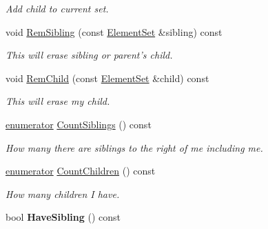 \begin{DoxyCompactItemize}
\begin{DoxyCompactList}\small\item\em Add child to current set. \end{DoxyCompactList}\item 
\hypertarget{classINMOST_1_1ElementSet_a8993015c5cb4f251d457c0bd02f31596}{void \hyperlink{classINMOST_1_1ElementSet_a8993015c5cb4f251d457c0bd02f31596}{Rem\-Sibling} (const \hyperlink{classINMOST_1_1ElementSet}{Element\-Set} \&sibling) const }\label{classINMOST_1_1ElementSet_a8993015c5cb4f251d457c0bd02f31596}

\begin{DoxyCompactList}\small\item\em This will erase sibling or parent's child. \end{DoxyCompactList}\item 
\hypertarget{classINMOST_1_1ElementSet_aa7b86070ba51b14b5cadcf598f6edb29}{void \hyperlink{classINMOST_1_1ElementSet_aa7b86070ba51b14b5cadcf598f6edb29}{Rem\-Child} (const \hyperlink{classINMOST_1_1ElementSet}{Element\-Set} \&child) const }\label{classINMOST_1_1ElementSet_aa7b86070ba51b14b5cadcf598f6edb29}

\begin{DoxyCompactList}\small\item\em This will erase my child. \end{DoxyCompactList}\item 
\hypertarget{classINMOST_1_1ElementSet_a0e93907cddd2f9486af14f497362f761}{\hyperlink{classINMOST_1_1Storage_ae333dfced6fa9cfde0c8e7dcf1b0cc2b}{enumerator} \hyperlink{classINMOST_1_1ElementSet_a0e93907cddd2f9486af14f497362f761}{Count\-Siblings} () const }\label{classINMOST_1_1ElementSet_a0e93907cddd2f9486af14f497362f761}

\begin{DoxyCompactList}\small\item\em How many there are siblings to the right of me including me. \end{DoxyCompactList}\item 
\hypertarget{classINMOST_1_1ElementSet_abd1a5a15dde363cd7c55d77028902dd5}{\hyperlink{classINMOST_1_1Storage_ae333dfced6fa9cfde0c8e7dcf1b0cc2b}{enumerator} \hyperlink{classINMOST_1_1ElementSet_abd1a5a15dde363cd7c55d77028902dd5}{Count\-Children} () const }\label{classINMOST_1_1ElementSet_abd1a5a15dde363cd7c55d77028902dd5}

\begin{DoxyCompactList}\small\item\em How many children I have. \end{DoxyCompactList}\item 
\hypertarget{classINMOST_1_1ElementSet_a8fb6b18ca91b86090562a412d648caed}{bool {\bfseries Have\-Sibling} () const }\label{classINMOST_1_1ElementSet_a8fb6b18ca91b86090562a412d648caed}


\end{DoxyCompactItemize}
